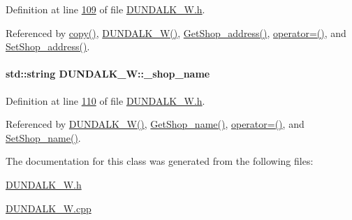Definition at line \hyperlink{_d_u_n_d_a_l_k___w_8h_source_l00109}{109} of file \hyperlink{_d_u_n_d_a_l_k___w_8h_source}{D\+U\+N\+D\+A\+L\+K\+\_\+\+W.\+h}.



Referenced by \hyperlink{_d_u_n_d_a_l_k___w_8cpp_source_l00035}{copy()}, \hyperlink{_d_u_n_d_a_l_k___w_8h_source_l00024}{D\+U\+N\+D\+A\+L\+K\+\_\+\+W()}, \hyperlink{_d_u_n_d_a_l_k___w_8cpp_source_l00129}{Get\+Shop\+\_\+address()}, \hyperlink{_d_u_n_d_a_l_k___w_8h_source_l00075}{operator=()}, and \hyperlink{_d_u_n_d_a_l_k___w_8cpp_source_l00125}{Set\+Shop\+\_\+address()}.

\paragraph[{\texorpdfstring{\+\_\+shop\+\_\+name}{_shop_name}}]{\setlength{\rightskip}{0pt plus 5cm}std\+::string D\+U\+N\+D\+A\+L\+K\+\_\+\+W\+::\+\_\+shop\+\_\+name\hspace{0.3cm}{\ttfamily [private]}}\hypertarget{class_d_u_n_d_a_l_k___w_ac9018980d31ba581cd83b07df0b171e2_ac9018980d31ba581cd83b07df0b171e2}{}\label{class_d_u_n_d_a_l_k___w_ac9018980d31ba581cd83b07df0b171e2_ac9018980d31ba581cd83b07df0b171e2}


Definition at line \hyperlink{_d_u_n_d_a_l_k___w_8h_source_l00110}{110} of file \hyperlink{_d_u_n_d_a_l_k___w_8h_source}{D\+U\+N\+D\+A\+L\+K\+\_\+\+W.\+h}.



Referenced by \hyperlink{_d_u_n_d_a_l_k___w_8h_source_l00024}{D\+U\+N\+D\+A\+L\+K\+\_\+\+W()}, \hyperlink{_d_u_n_d_a_l_k___w_8cpp_source_l00121}{Get\+Shop\+\_\+name()}, \hyperlink{_d_u_n_d_a_l_k___w_8h_source_l00075}{operator=()}, and \hyperlink{_d_u_n_d_a_l_k___w_8cpp_source_l00117}{Set\+Shop\+\_\+name()}.



The documentation for this class was generated from the following files\+:\begin{DoxyCompactItemize}
\item 
\hyperlink{_d_u_n_d_a_l_k___w_8h}{D\+U\+N\+D\+A\+L\+K\+\_\+\+W.\+h}\item 
\hyperlink{_d_u_n_d_a_l_k___w_8cpp}{D\+U\+N\+D\+A\+L\+K\+\_\+\+W.\+cpp}\end{DoxyCompactItemize}
